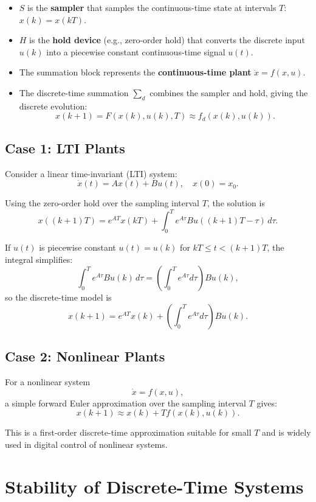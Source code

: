\begin{itemize}
    \item \(S\) is the \textbf{sampler} that samples the continuous-time state at intervals \(T\): \(x(k)=x(kT)\).  
    \item \(H\) is the \textbf{hold device} (e.g., zero-order hold) that converts the discrete input \(u(k)\) into a piecewise constant continuous-time signal \(u(t)\).  
    \item The summation block represents the \textbf{continuous-time plant} \(\dot{x}=f(x,u)\).  
    \item The discrete-time summation \(\sum_d\) combines the sampler and hold, giving the discrete evolution:
    \[
    x(k+1) = F(x(k), u(k), T) \approx f_d(x(k),u(k)).
    \]
\end{itemize}

\subsection{Case 1: LTI Plants}

Consider a linear time-invariant (LTI) system:
\[
\dot{x}(t) = A x(t) + B u(t), \quad x(0) = x_0.
\]

Using the zero-order hold over the sampling interval \(T\), the solution is
\[
x((k+1)T) = e^{A T} x(kT) + \int_{0}^{T} e^{A\tau} B u((k+1)T - \tau) \, d\tau.
\]

If \(u(t)\) is piecewise constant \(u(t) = u(k)\) for \(kT \le t < (k+1)T\), the integral simplifies:
\[
\int_0^T e^{A \tau} B u(k) \, d\tau = \left(\int_0^T e^{A \tau} d\tau \right) B u(k),
\]
so the discrete-time model is
\[
\boxed{x(k+1) = e^{A T} x(k) + \left( \int_0^T e^{A \tau} d\tau \right) B u(k)}.
\]

\subsection{Case 2: Nonlinear Plants}

For a nonlinear system
\[
\dot{x} = f(x,u),
\]
a simple forward Euler approximation over the sampling interval \(T\) gives:
\[
\boxed{x(k+1) \approx x(k) + T f(x(k), u(k))}.
\]

This is a first-order discrete-time approximation suitable for small \(T\) and is widely used in digital control of nonlinear systems.

\section{Stability of Discrete-Time Systems}


